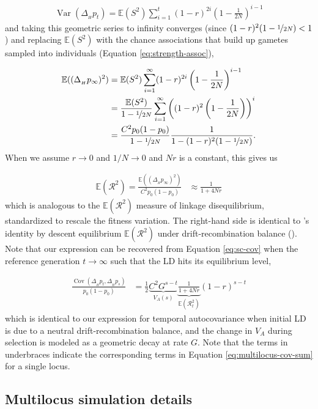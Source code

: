 \documentclass[11pt]{article}
\newcommand{\E}{\mathbb{E}}
\DeclareMathOperator{\var}{Var}
\DeclareMathOperator{\cov}{Cov}
\begin{document}
\begin{align}
  \var(\Delta_{_H} p_t) = \E(S^2) \sum_{i=1}^t (1-r)^{2i} \left(1-\frac{1}{2N}\right)^{i-1}
\end{align}
%
and taking this geometric series to infinity converges (since $(1-r)^2
(1-\nicefrac{1}{2N}) < 1$) and replacing $\E(S^2)$ with the chance associations
that build up gametes sampled into individuals (Equation
\eqref{eq:strength-assoc}),

\begin{align}
  \E((\Delta_{_H} p_\infty)^2) &= \E(S^2) \sum_{i=1}^\infty (1-r)^{2i} \left(1-\frac{1}{2N}\right)^{i-1} \nonumber \\
                             &= \frac{\E(S^2)}{1-\nicefrac{1}{2N}} \sum_{i=1}^\infty \left((1-r)^2 \left(1-\frac{1}{2N}\right)\right)^{i} \nonumber \\
                             &= \frac{C^2 p_0(1-p_0)}{1-\nicefrac{1}{2N}} \frac{1}{1-(1-r)^2 (1-\nicefrac{1}{2N})}.
\end{align}
% 
When we assume $r \to 0$ and $1/N \to 0$ and $Nr$ is a constant, this gives us

\begin{align}
  \E(\mathcal{R}^2) = \frac{\E((\Delta_{_H} p_\infty)^2)}{C^2 p_0(1-p_0)} &\approx \frac{1}{1 + 4Nr}
\end{align}
%
which is analogous to the $\E(\mathcal{R}^2)$ measure of linkage disequilibrium,
standardized to rescale the fitness variation. The right-hand side is identical
to \citeauthor{Sved1971-dv}'s identity by descent equilibrium $\E(\mathcal{R}^2)$ under
drift-recombination balance (\citeyear{Sved1971-dv}). Note that our expression
can be recovered from Equation \eqref{eq:sc-cov} when the reference generation
$t \to \infty$ such that the LD hits its equilibrium level,

\begin{align}
  \frac{\cov(\Delta_{_H} p_t, \Delta_{_H} p_s)}{p_0(1-p_0)} &= \frac{1}{2} \underbrace{C^2 G^{s-t}}_{V_A(s)} \underbrace{\frac{1}{1 + 4Nr}}_{\E(\mathcal{R}_t^2)} (1-r)^{s-t}
\end{align}
%
which is identical to our expression for temporal autocovariance when initial
LD is due to a neutral drift-recombination balance, and the change in $V_A$
during selection is modeled as a geometric decay at rate $G$.  Note that the
terms in underbraces indicate the corresponding terms in Equation
\eqref{eq:multilocus-cov-sum} for a single locus.

\subsection{Multilocus simulation details}
\label{sec:supp-ml-sim}
\end{document}
